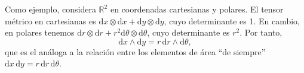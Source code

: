 \begin{observation}
    Como ejemplo, considera \(\mathbb{R}^2\) en coordenadas cartesianas y polares. El tensor métrico en cartesianas es \(\mathrm{d}x\otimes\mathrm{d}x + \mathrm{d}y\otimes\mathrm{d}y\), cuyo determinante es 1. En cambio, en polares tenemos \(\mathrm{d}r\otimes\mathrm{d}r+r^2\mathrm{d}\theta\otimes\mathrm{d}\theta\), cuyo determinante es \(r^2\). Por tanto,
    \begin{equation*}
        \mathrm{d}x\wedge\mathrm{d}y = r\,\mathrm{d}r\wedge\mathrm{d}\theta,
    \end{equation*}
    que es el análoga a la relación entre los elementos de área ``de siempre'' \(\mathrm{d}x\, \mathrm{d}y = r\,\mathrm{d}r\,\mathrm{d}\theta\).
\end{observation}